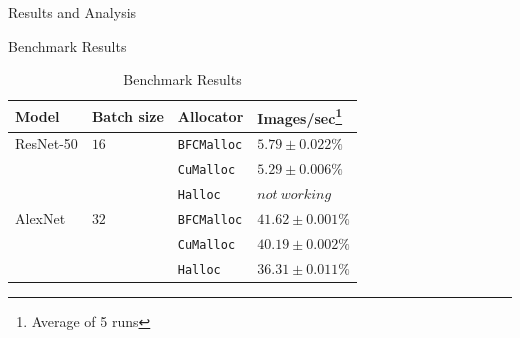 \documentclass[10pt]{beamer}
\newcommand{\resnettimebfc}{$5.79\pm0.022\%$}     %
\newcommand{\resnettimecuda}{$5.29\pm0.006\%$}    %
\newcommand{\resnettimehalloc}{$not~working$}     %
\newcommand{\alexnettimebfc}{$41.62\pm0.001\%$}   %
\newcommand{\alexnettimecuda}{$40.19\pm0.002\%$}  %
\newcommand{\alexnettimehalloc}{$36.31\pm0.011\%$}%
\begin{document}
\begin{frame}[fragile]{Results and Analysis}


\begin{exampleblock}{Benchmark Results}

    \begin{table}[!ht]
    \centering
    \caption{Benchmark Results}
    \label{tab:results}
    \begin{tabular}{|l|l|l|l|}
    \hline
    \textbf{Model}     & \textbf{Batch size}  & \textbf{Allocator}          & \textbf{Images/sec}\footnote{Average of 5 runs}         \\ \hline
    ResNet-50 & $16$        & \texttt{BFCMalloc} & \resnettimebfc     \\ \cline{3-4} 
              &             & \texttt{CuMalloc}  & \resnettimecuda    \\ \cline{3-4} 
              &             & \texttt{Halloc}    & \resnettimehalloc  \\ \hline
    AlexNet   & $32$        & \texttt{BFCMalloc} & \alexnettimebfc    \\ \cline{3-4} 
              &             & \texttt{CuMalloc}  & \alexnettimecuda   \\ \cline{3-4} 
              &             & \texttt{Halloc}    & \alexnettimehalloc \\ \hline
    \end{tabular}
    \end{table}
\end{exampleblock}

\end{frame}
\end{document}
